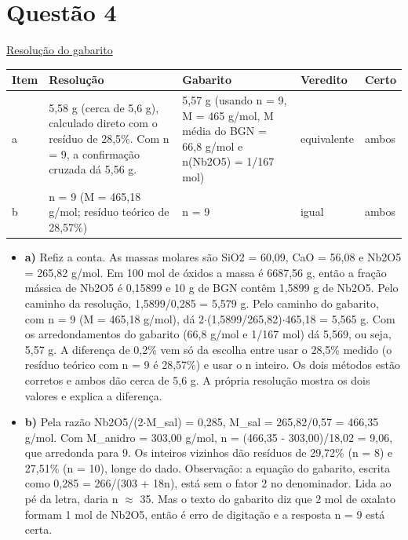 \documentclass{article}%
\begin{document}
\section*{Questão 4}%
\href{https://poliedroresolve.sistemapoliedro.com.br/vestibulares/ita/2026/ita-2-fase-dia-2-29-10-2025-2-fase-dia-2/dissertativa-4-quimica-2-fase-dia-2-ita-2026}{Resolução do gabarito}\par\smallskip%
\begin{longtable}{@{}p{} p{} p{} p{} p{}@{}}\toprule Item & Resolução & Gabarito & Veredito & Certo \\ \midrule
a & 5,58 g (cerca de 5,6 g), calculado direto com o resíduo de 28,5\%. Com n = 9, a confirmação cruzada dá 5,56 g. & 5,57 g (usando n = 9, M = 465 g/mol, M média do BGN = 66,8 g/mol e n(Nb2O5) = 1/167 mol) & equivalente & ambos \\
b & n = 9 (M = 465,18 g/mol; resíduo teórico de 28,57\%) & n = 9 & igual & ambos \\
\bottomrule\end{longtable}%
\begin{itemize}%
\item%
\textbf{a)} Refiz a conta. As massas molares são SiO2 = 60,09, CaO = 56,08 e Nb2O5 = 265,82 g/mol. Em 100 mol de óxidos a massa é 6687,56 g, então a fração mássica de Nb2O5 é 0,15899 e 10 g de BGN contêm 1,5899 g de Nb2O5. Pelo caminho da resolução, 1,5899/0,285 = 5,579 g. Pelo caminho do gabarito, com n = 9 (M = 465,18 g/mol), dá 2$\cdot$(1,5899/265,82)$\cdot$465,18 = 5,565 g. Com os arredondamentos do gabarito (66,8 g/mol e 1/167 mol) dá 5,569, ou seja, 5,57 g. A diferença de 0,2\% vem só da escolha entre usar o 28,5\% medido (o resíduo teórico com n = 9 é 28,57\%) e usar o n inteiro. Os dois métodos estão corretos e ambos dão cerca de 5,6 g. A própria resolução mostra os dois valores e explica a diferença.%
\item%
\textbf{b)} Pela razão Nb2O5/(2$\cdot$M\_sal) = 0,285, M\_sal = 265,82/0,57 = 466,35 g/mol. Com M\_anidro = 303,00 g/mol, n = (466,35 - 303,00)/18,02 = 9,06, que arredonda para 9. Os inteiros vizinhos dão resíduos de 29,72\% (n = 8) e 27,51\% (n = 10), longe do dado. Observação: a equação do gabarito, escrita como 0,285 = 266/(303 + 18n), está sem o fator 2 no denominador. Lida ao pé da letra, daria n $\approx$ 35. Mas o texto do gabarito diz que 2 mol de oxalato formam 1 mol de Nb2O5, então é erro de digitação e a resposta n = 9 está certa.%
\end{itemize}%
\end{document}
